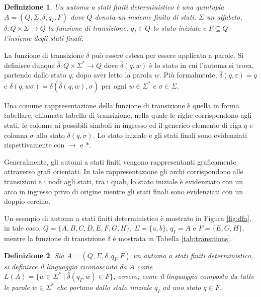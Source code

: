 \documentclass[a4paper,12pt,twoside,openright]{report}
\newtheorem{definition}{Definizione}[chapter] %
\begin{document}
\begin{definition}
  \label{def:dfa}
  Un \emph{automa a stati finiti deterministico} è una quintupla $A = (Q, \Sigma, \delta, \allowbreak q_I, F)$
  dove $Q$ denota un insieme finito di stati, $\Sigma$ un alfabeto, $\delta: Q \times \Sigma \rightarrow Q$ 
  la funzione di transizione, $q_I \in Q$ lo stato iniziale e $F \subseteq Q$ l'insieme degli stati finali.
\end{definition}

La funzione di transizione $\delta$ può essere estesa per essere applicata a parole. Si definisce dunque
$\hat{\delta}: Q \times \Sigma^* \rightarrow Q$ dove $\hat{\delta}(q, w)$ è lo stato in cui l'automa si trova,
partendo dallo stato $q$, dopo aver letto la parola $w$. Più formalmente, $\hat{\delta}(q, \varepsilon) = q$ e
$\hat{\delta}(q, w\sigma) = \delta(\hat{\delta}(q, w), \sigma)$ per ogni $w \in \Sigma^*$ e $\sigma \in \Sigma$.

Una comune rappresentazione della funzione di transizione è quella in forma tabellare, chiamata tabella di transizione,
nella quale le righe corrispondono agli stati, le colonne ai possibili simboli in ingresso ed il generico elemento
di riga $q$ e colonna $\sigma$ allo stato $\delta(q, \sigma)$. Lo stato iniziale e gli stati finali sono evidenziati
rispettivamente con $\rightarrow$ e $*$.

Generalmente, gli automi a stati finiti vengono rappresentanti graficamente attraverso grafi orientati.
In tale rappresentazione gli archi corrispondono alle transizioni e i nodi agli stati, tra i quali, lo stato iniziale è
evidenziato con un arco in ingresso privo di origine mentre gli stati finali sono evidenziati con un doppio cerchio.

Un esempio di automa a stati finiti deterministico è mostrato in Figura \ref{fig:dfa}, in tale caso,
$Q = \{A, B, C, D, E, F, G, H\}$, $\Sigma = \{a, b\}$, $q_I = A$ e $F = \{E, G, H\}$, mentre
la funzione di transizione $\delta$ è mostrata in Tabella \ref{tab:transitions}.

\begin{definition}
  \label{def:reg-lang}
  Sia $A = (Q, \Sigma, \delta, q_I, F)$ un automa a stati finiti deterministico, si definisce il \emph{linguaggio
  riconosciuto} da $A$ come $L(A) = \{w \in \Sigma^* \mid \hat{\delta}(q_I, w) \in F\}$, ovvero, come
  il linguaggio composto da tutte le parole $w \in \Sigma^*$ che portano dallo stato iniziale $q_I$ ad
  uno stato $q \in F$.
\end{definition}
\end{document}
